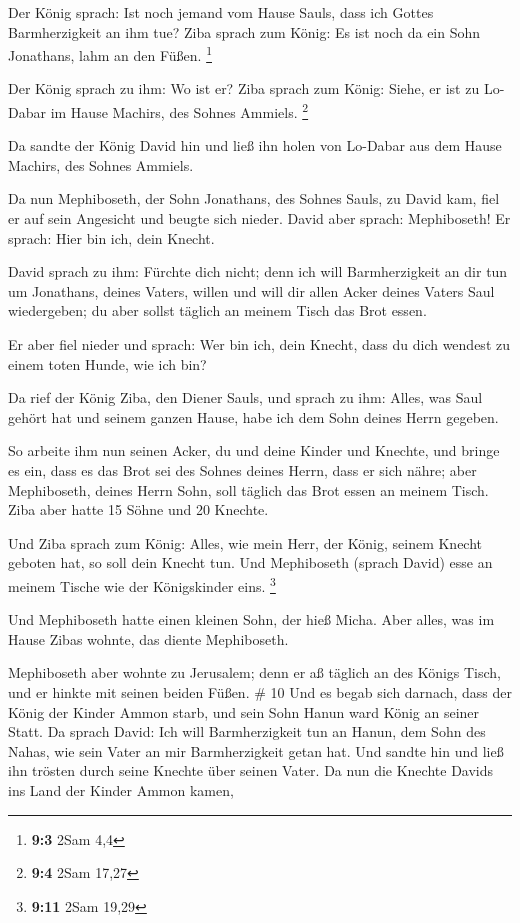  Der König sprach: Ist noch jemand vom Hause Sauls, dass ich
Gottes Barmherzigkeit an ihm tue? Ziba sprach zum König: Es ist noch da
ein Sohn Jonathans, lahm an den Füßen. \footnote{\textbf{9:3} 2Sam 4,4}

 Der König sprach zu ihm: Wo ist er? Ziba sprach zum König:
Siehe, er ist zu Lo-Dabar im Hause Machirs, des Sohnes Ammiels.
\footnote{\textbf{9:4} 2Sam 17,27}

 Da sandte der König David hin und ließ ihn holen von
Lo-Dabar aus dem Hause Machirs, des Sohnes Ammiels.

 Da nun Mephiboseth, der Sohn Jonathans, des Sohnes Sauls,
zu David kam, fiel er auf sein Angesicht und beugte sich nieder. David
aber sprach: Mephiboseth! Er sprach: Hier bin ich, dein Knecht.

 David sprach zu ihm: Fürchte dich nicht; denn ich will
Barmherzigkeit an dir tun um Jonathans, deines Vaters, willen und will
dir allen Acker deines Vaters Saul wiedergeben; du aber sollst täglich
an meinem Tisch das Brot essen.

 Er aber fiel nieder und sprach: Wer bin ich, dein Knecht,
dass du dich wendest zu einem toten Hunde, wie ich bin?

 Da rief der König Ziba, den Diener Sauls, und sprach zu
ihm: Alles, was Saul gehört hat und seinem ganzen Hause, habe ich dem
Sohn deines Herrn gegeben.

 So arbeite ihm nun seinen Acker, du und deine Kinder und
Knechte, und bringe es ein, dass es das Brot sei des Sohnes deines
Herrn, dass er sich nähre; aber Mephiboseth, deines Herrn Sohn, soll
täglich das Brot essen an meinem Tisch. Ziba aber hatte 15 Söhne und 20
Knechte.

 Und Ziba sprach zum König: Alles, wie mein Herr, der
König, seinem Knecht geboten hat, so soll dein Knecht tun. Und
Mephiboseth (sprach David) esse an meinem Tische wie der Königskinder
eins. \footnote{\textbf{9:11} 2Sam 19,29}

 Und Mephiboseth hatte einen kleinen Sohn, der hieß Micha.
Aber alles, was im Hause Zibas wohnte, das diente Mephiboseth.

 Mephiboseth aber wohnte zu Jerusalem; denn er aß täglich
an des Königs Tisch, und er hinkte mit seinen beiden Füßen. \# 10
 Und es begab sich darnach, dass der König der Kinder Ammon
starb, und sein Sohn Hanun ward König an seiner Statt.  Da
sprach David: Ich will Barmherzigkeit tun an Hanun, dem Sohn des Nahas,
wie sein Vater an mir Barmherzigkeit getan hat. Und sandte hin und ließ
ihn trösten durch seine Knechte über seinen Vater. Da nun die Knechte
Davids ins Land der Kinder Ammon kamen,

